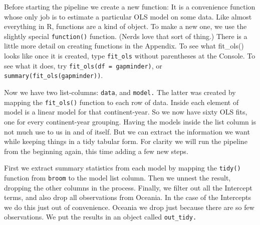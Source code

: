 \documentclass[]{book}
\begin{document}
Before starting the pipeline we create a new function: It is a convenience function whose only job is to estimate a particular OLS model on some data. Like almost everything in R, functions are a kind of object. To make a new one, we use the slightly special \texttt{function()} function. (Nerds love that sort of thing.) There is a little more detail on creating functions in the Appendix. To see what fit\_ols() looks like once it is created, type \texttt{fit\_ols} without parentheses at the Console. To see what it does, try \texttt{fit\_ols(df\ =\ gapminder)}, or \texttt{summary(fit\_ols(gapminder))}.

Now we have two list-columns: \texttt{data}, and \texttt{model.} The latter was created by mapping the \texttt{fit\_ols()} function to each row of data. Inside each element of model is a linear model for that continent-year. So we now have sixty OLS fits, one for every continent-year grouping. Having the models inside the list column is not much use to us in and of itself. But we can extract the information we want while keeping things in a tidy tabular form. For clarity we will run the pipeline from the beginning again, this time adding a few new steps.

First we extract summary statistics from each model by mapping the \texttt{tidy()} function from \texttt{broom} to the model list column. Then we unnest the result, dropping the other columns in the process. Finally, we filter out all the Intercept terms, and also drop all observations from Oceania. In the case of the Intercepts we do this just out of convenience. Oceania we drop just because there are so few observations. We put the results in an object called \texttt{out\_tidy.}\\
\end{document}
